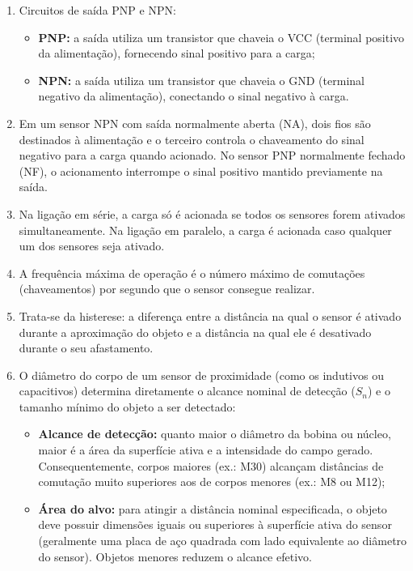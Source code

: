 \begin{enumerate}[label=\textbf{\arabic*)}, leftmargin=*]
    \item Circuitos de saída PNP e NPN:
        \begin{itemize}
            \item \textbf{PNP:} a saída utiliza um transistor que chaveia o VCC (terminal positivo da alimentação), fornecendo sinal positivo para a carga;
            \item \textbf{NPN:} a saída utiliza um transistor que chaveia o GND (terminal negativo da alimentação), conectando o sinal negativo à carga.
        \end{itemize}

    \item Em um sensor NPN com saída normalmente aberta (NA), dois fios são destinados à alimentação e o terceiro controla o chaveamento do sinal negativo para a carga quando acionado. No sensor PNP normalmente fechado (NF), o acionamento interrompe o sinal positivo mantido previamente na saída.

    \item Na ligação em série, a carga só é acionada se todos os sensores forem ativados simultaneamente. Na ligação em paralelo, a carga é acionada caso qualquer um dos sensores seja ativado.

    \item A frequência máxima de operação é o número máximo de comutações (chaveamentos) por segundo que o sensor consegue realizar.

    \item Trata-se da histerese: a diferença entre a distância na qual o sensor é ativado durante a aproximação do objeto e a distância na qual ele é desativado durante o seu afastamento.

    \item O diâmetro do corpo de um sensor de proximidade (como os indutivos ou capacitivos) determina diretamente o alcance nominal de detecção ($S_n$) e o tamanho mínimo do objeto a ser detectado:
        \begin{itemize}
            \item \textbf{Alcance de detecção:} quanto maior o diâmetro da bobina ou núcleo, maior é a área da superfície ativa e a intensidade do campo gerado. Consequentemente, corpos maiores (ex.: M30) alcançam distâncias de comutação muito superiores aos de corpos menores (ex.: M8 ou M12);
            \item \textbf{Área do alvo:} para atingir a distância nominal especificada, o objeto deve possuir dimensões iguais ou superiores à superfície ativa do sensor (geralmente uma placa de aço quadrada com lado equivalente ao diâmetro do sensor). Objetos menores reduzem o alcance efetivo.
        \end{itemize}


\end{enumerate}
